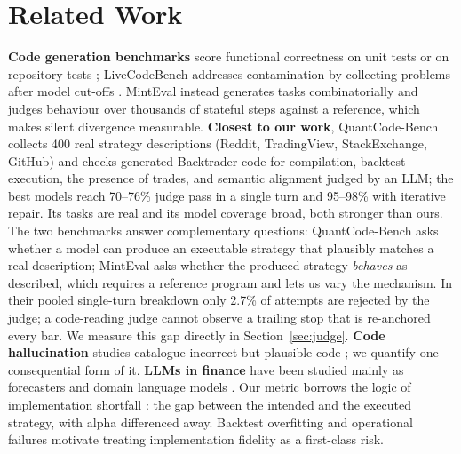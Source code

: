 \documentclass[sigconf,nonacm]{acmart}
\begin{document}
\section{Related Work}
\textbf{Code generation benchmarks} score functional correctness on unit tests
\cite{chen2021humaneval,austin2021mbpp,liu2023evalplus,lai2023ds1000,zhuo2024bigcodebench} or on
repository tests \cite{jimenez2024swebench}; LiveCodeBench addresses contamination by collecting
problems after model cut-offs \cite{jain2024livecodebench}. MintEval instead generates tasks
combinatorially and judges behaviour over thousands of stateful steps against a reference, which
makes silent divergence measurable. \textbf{Closest to our work}, QuantCode-Bench \cite{khoroshilov2026quantcode} collects 400 real strategy
descriptions (Reddit, TradingView, StackExchange, GitHub) and checks generated Backtrader code for
compilation, backtest execution, the presence of trades, and semantic alignment judged by an LLM;
the best models reach 70--76\% judge pass in a single turn and 95--98\% with iterative repair. Its
tasks are real and its model coverage broad, both stronger than ours. The two benchmarks answer
complementary questions: QuantCode-Bench asks whether a model can produce an executable strategy
that plausibly matches a real description; MintEval asks whether the produced strategy
\emph{behaves} as described, which requires a reference program and lets us vary the mechanism.
In their pooled single-turn breakdown only 2.7\% of attempts are rejected by the judge; a
code-reading judge cannot observe a trailing stop that is re-anchored every bar. We measure this
gap directly in Section~\ref{sec:judge}. \textbf{Code hallucination} studies catalogue incorrect but
plausible code \cite{tian2024codehalu,zhang2024hallucode}; we quantify one consequential form of it.
\textbf{LLMs in finance} have been studied mainly as forecasters and domain language models
\cite{lopezlira2023chatgpt,wu2023bloomberggpt,yang2023fingpt}. Our metric borrows the logic of
implementation shortfall \cite{perold1988implementation}: the gap between the intended and the
executed strategy, with alpha differenced away. Backtest overfitting \cite{bailey2014pseudo,bailey2016pbo}
and operational failures \cite{sec2013knight} motivate treating implementation fidelity as a
first-class risk.
\end{document}
